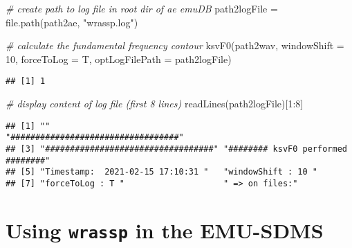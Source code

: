 \documentclass[
]{book}
\newenvironment{Shaded}{\begin{snugshade}}{\end{snugshade}}
\newcommand{\AttributeTok}[1]{\textcolor[rgb]{0.77,0.63,0.00}{#1}}
\newcommand{\CommentTok}[1]{\textcolor[rgb]{0.56,0.35,0.01}{\textit{#1}}}
\newcommand{\DecValTok}[1]{\textcolor[rgb]{0.00,0.00,0.81}{#1}}
\newcommand{\FunctionTok}[1]{\textcolor[rgb]{0.00,0.00,0.00}{#1}}
\newcommand{\NormalTok}[1]{#1}
\newcommand{\OtherTok}[1]{\textcolor[rgb]{0.56,0.35,0.01}{#1}}
\newcommand{\SpecialCharTok}[1]{\textcolor[rgb]{0.00,0.00,0.00}{#1}}
\newcommand{\StringTok}[1]{\textcolor[rgb]{0.31,0.60,0.02}{#1}}
\begin{document}
\begin{Shaded}
\begin{Highlighting}[]
\CommentTok{\# create path to log file in root dir of ae emuDB}
\NormalTok{path2logFile }\OtherTok{=} \FunctionTok{file.path}\NormalTok{(path2ae, }\StringTok{"wrassp.log"}\NormalTok{)}

\CommentTok{\# calculate the fundamental frequency contour}
\FunctionTok{ksvF0}\NormalTok{(path2wav, }
      \AttributeTok{windowShift =} \DecValTok{10}\NormalTok{,}
      \AttributeTok{forceToLog =}\NormalTok{ T, }
      \AttributeTok{optLogFilePath =}\NormalTok{ path2logFile)}
\end{Highlighting}
\end{Shaded}

\begin{verbatim}
## [1] 1
\end{verbatim}

\begin{Shaded}
\begin{Highlighting}[]
\CommentTok{\# display content of log file (first 8 lines)}
\FunctionTok{readLines}\NormalTok{(path2logFile)[}\DecValTok{1}\SpecialCharTok{:}\DecValTok{8}\NormalTok{]}
\end{Highlighting}
\end{Shaded}

\begin{verbatim}
## [1] ""                                   "##################################"
## [3] "##################################" "######## ksvF0 performed ########" 
## [5] "Timestamp:  2021-02-15 17:10:31 "   "windowShift : 10 "                 
## [7] "forceToLog : T "                    " => on files:"
\end{verbatim}

\hypertarget{sec:wrassp-emu-sdms}{%
\section{\texorpdfstring{Using \texttt{wrassp} in the EMU-SDMS}{Using wrassp in the EMU-SDMS}}\label{sec:wrassp-emu-sdms}}
\end{document}
